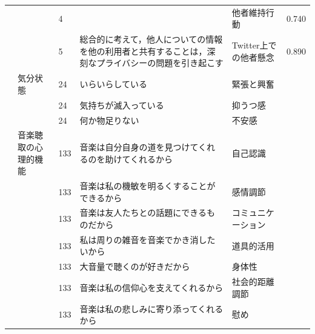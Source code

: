 \begin{landscape}
\begin{longtable}{p{2cm}p{2cm}p{2cm}p{6cm}p{2cm}p{2cm}}
		                         &                                  & 4   &                                                     & 他者維持行動               & 0.740      \\
		                         &                                  & 5   & 総合的に考えて，他人についての情報を他の利用者と共有することは，深刻なプライバシーの問題を引き起こす  & Twitter上での他者懸念       & 0.890      \\
		\textcite{Ishikawa202192}   & 気分状態                             & 24  & いらいらしている                                            & 緊張と興奮                &            \\
		                         &                                  & 24  & 気持ちが滅入っている                                          & 抑うつ感                 &            \\
		                         &                                  & 24  & 何か物足りない                                             & 不安感                  &            \\
		\textcite{Ikegmai202192}    & 音楽聴取の心理的機能                       & 133 & 音楽は自分自身の道を見つけてくれるのを助けてくれるから                         & 自己認識                 &            \\
		                         &                                  & 133 & 音楽は私の機敏を明るくすることができるから                               & 感情調節                 &            \\
		                         &                                  & 133 & 音楽は友人たちとの話題にできるものだから                                & コミュニケーション            &            \\
		                         &                                  & 133 & 私は周りの雑音を音楽でかき消したいから                                 & 道具的活用                &            \\
		                         &                                  & 133 & 大音量で聴くのが好きだから                                       & 身体性                  &            \\
		                         &                                  & 133 & 音楽は私の信仰心を支えてくれるから                                   & 社会的距離調節              &            \\
		                         &                                  & 133 & 音楽は私の悲しみに寄り添ってくれるから                                 & 慰め                   &            \\

\end{longtable}
\end{landscape}
